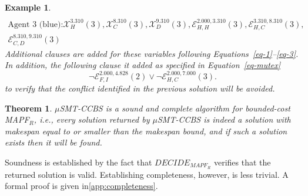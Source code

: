 \documentclass[review]{elsarticle}
\newtheorem{theorem}{Theorem}
\newtheorem{example}{Example}
\newcommand{\decidemapfr}{\ensuremath{\mathit{DECIDE_{MAPF_R}}}\xspace}
\newcommand{\mapfr}{\ac{MAPF}$_R$\xspace}
\newcommand{\musmtccbs}{\ensuremath{\mu}SMT-CCBS\xspace}
\begin{document}
\begin{example}
\begin{multline*}
\end{multline*}
\begin{multline*}
    \text{Agent 3 (blue):}
    \mathcal{X}_H^{3.310}(3), \mathcal{X}_C^{8.310}(3),
\mathcal{X}_D^{9.310}(3), 
\mathcal{E}_{H,H}^{2.000,3.310}(3), \mathcal{E}_{H,C}^{3.310,8.310}(3),\\ \mathcal{E}_{C,D}^{8.310,9.310}(3)
\end{multline*}
Additional clauses are added for these variables following Equations~\ref{eq-1}--\ref{eq-3}. 
In addition, the following clause it added as specified in Equation~\ref{eq-mutex}
\begin{equation}
  \neg \mathcal{E}_{F,I}^{2.000,4.828}(2) \vee \neg \mathcal{E}_{H,C}^{2.000,7.000}(3).
\end{equation}
to verify that the conflict identified in the previous solution will be avoided.
\end{example}

\begin{theorem}
	\musmtccbs is a sound and complete algorithm for bounded-cost \mapfr, 
	i.e., every solution returned by \musmtccbs is indeed a solution with makespan equal to or smaller than the makespan bound, 
	and if such a solution exists then it will be found. 
	\label{the:bounded-cost-makespan}
\end{theorem}
Soundness is established by the fact that \decidemapfr verifies that the returned solution is valid. Establishing completeness, however, is less trivial. 
A formal proof is given in\ref{app:completeness}. 
\end{document}
